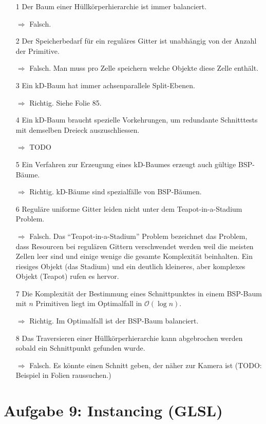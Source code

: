 \documentclass[a4paper]{scrartcl}
\begin{document}
\begin{itemize}
    \item[1] Der Baum einer Hüllkörperhierarchie ist immer balanciert.
    \item[$\Rightarrow$] Falsch.
    \item[2] Der Speicherbedarf für ein reguläres Gitter ist unabhängig von der Anzahl der Primitive.
    \item[$\Rightarrow$] Falsch. Man muss pro Zelle speichern welche Objekte diese Zelle enthält.
    \item[3] Ein kD-Baum hat immer achsenparallele Split-Ebenen.
    \item[$\Rightarrow$] Richtig. Siehe Folie 85.
    \item[4] Ein kD-Baum braucht spezielle Vorkehrungen, um redundante Schnitttests mit demselben Dreieck auszuschliessen.
    \item[$\Rightarrow$] TODO
    \item[5] Ein Verfahren zur Erzeugung eines kD-Baumes erzeugt auch gültige BSP-Bäume.
    \item[$\Rightarrow$] Richtig. kD-Bäume sind spezialfälle von BSP-Bäumen.
    \item[6] Reguläre uniforme Gitter leiden nicht unter dem Teapot-in-a-Stadium Problem.
    \item[$\Rightarrow$] Falsch. Das \enquote{Teapot-in-a-Stadium} Problem bezeichnet
    das Problem, dass Resourcen bei regulären Gittern verschwendet werden weil
    die meisten Zellen leer sind und einige wenige die gesamte Komplexität
    beinhalten. Ein riesiges Objekt (das Stadium) und ein deutlich kleineres,
    aber komplexes Objekt (Teapot) rufen es hervor.
    \item[7] Die Komplexität der Bestimmung eines Schnittpunktes in einem BSP-Baum mit $n$ Primitiven liegt im Optimalfall in $\mathcal{O}(\log n)$.
    \item[$\Rightarrow$] Richtig. Im Optimalfall ist der BSP-Baum balanciert.
    \item[8] Das Traversieren einer Hüllkörperhierarchie kann abgebrochen werden sobald ein Schnittpunkt gefunden wurde.
    \item[$\Rightarrow$] Falsch. Es könnte einen Schnitt geben, der näher zur Kamera ist (TODO: Beispiel in Folien raussuchen.)
\end{itemize}

\clearpage
\section*{Aufgabe 9: Instancing (GLSL)}
\inputminted[linenos, numbersep=5pt, tabsize=4, frame=lines, label=shader.vert]{glsl}{shader.vert}
\end{document}
